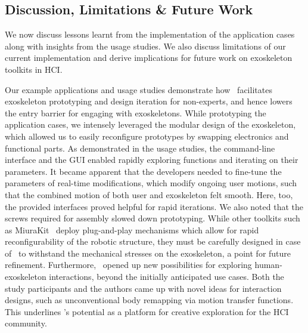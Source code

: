 \subsection{Discussion, Limitations \& Future Work}
We now discuss lessons learnt from the implementation of the application cases along with insights from the usage studies. We also discuss limitations of our current implementation and derive implications for future work on exoskeleton toolkits in HCI. 

Our example applications and usage studies demonstrate how \toolkit~facilitates exoskeleton prototyping and design iteration for non-experts, and hence lowers the entry barrier for engaging with exoskeletons. While prototyping the application cases, we intensely leveraged the modular design of the exoskeleton, which allowed us to easily reconfigure prototypes by swapping electronics and functional parts. As demonstrated in the usage studies, the command-line interface and the GUI enabled rapidly exploring functions and iterating on their parameters. It became apparent that the developers needed to fine-tune the parameters of real-time modifications, which modify ongoing user motions, such that the combined motion of both user and exoskeleton felt smooth. Here, too, the provided interfaces proved helpful for rapid iterations. We also noted that the screws required for assembly slowed down prototyping. While other toolkits such as MiuraKit~\cite{cui_2023} 
deploy plug-and-play mechanisms which allow for rapid reconfigurability of the robotic structure, they must be carefully designed in case of \toolkit~to withstand the mechanical stresses on the exoskeleton, a point for future refinement.
Furthermore, \toolkit~opened up new possibilities for exploring human-exoskeleton interactions, beyond the initially anticipated use cases. Both the study participants and the authors came up with novel ideas for interaction designs, such as unconventional body remapping via motion transfer functions. This underlines \toolkit's potential as a platform for creative exploration for the HCI community. 

